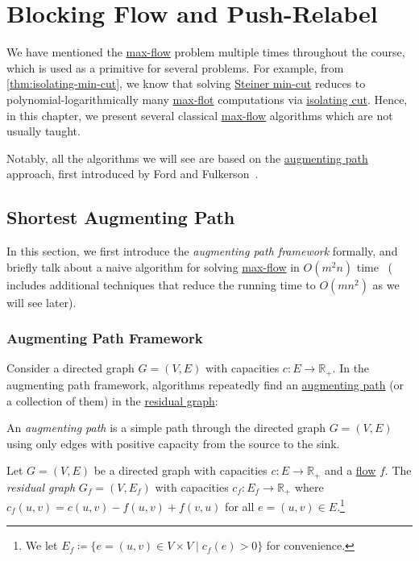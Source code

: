 \chapter{Blocking Flow and Push-Relabel}
We have mentioned the \hyperref[prb:s-t-max-flow]{max-flow} problem multiple times throughout the course, which is used as a primitive for several problems. For example, from \autoref{thm:isolating-min-cut}, we know that solving \hyperref[prb:Steiner-min-cut]{Steiner min-cut} reduces to polynomial-logarithmically many \hyperref[prb:s-t-max-flow]{max-flot} computations via \hyperref[prb:isolating-cut]{isolating cut}. Hence, in this chapter, we present several classical \hyperref[prb:s-t-max-flow]{max-flow} algorithms which are not usually taught.

Notably, all the algorithms we will see are based on the \hyperref[def:augmenting-path]{augmenting path} approach, first introduced by Ford and Fulkerson~\cite{ford1956maximal}.

\section{Shortest Augmenting Path}
In this section, we first introduce the \emph{augmenting path framework} formally, and briefly talk about a naive algorithm for solving \hyperref[prb:s-t-max-flow]{max-flow} in \(O(m^2 n)\) time~\cite{dinic1970algorithm,edmonds1972theoretical} (\cite{dinic1970algorithm} includes additional techniques that reduce the running time to \(O(m n^2)\) as we will see later).

\subsection{Augmenting Path Framework}
Consider a directed graph \(G = (V, E)\) with capacities \(c \colon E \to \mathbb{R} _{+}\). In the augmenting path framework, algorithms repeatedly find an \hyperref[def:augmenting-path]{augmenting path} (or a collection of them) in the \hyperref[def:residual-graph]{residual graph}:

\begin{definition}\label{def:augmenting-path}
	An \emph{augmenting path} is a simple path through the directed graph \(G = (V, E)\) using only edges with positive capacity from the source to the sink.
\end{definition}

\begin{definition}\label{def:residual-graph}
	Let \(G = (V, E)\) be a directed graph with capacities \(c \colon E \to \mathbb{R} _{+}\) and a \hyperref[def:flow]{flow} \(f\). The \emph{residual graph} \(G_f = (V, E_f )\) with capacities \(c_f \colon E_f \to \mathbb{R} _{+}\) where \(c_f (u, v) = c(u, v) - f(u, v) + f(v, u)\) for all \(e = (u, v) \in E\).\footnote{We let \(E_f \coloneqq \{ e = (u, v) \in V \times V \mid c_f(e) > 0 \} \) for convenience.}
\end{definition}

